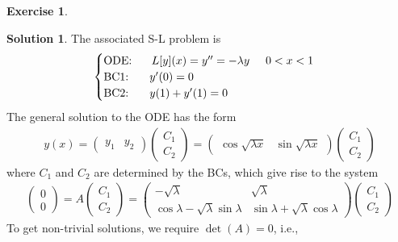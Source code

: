 \documentclass{article}
\theoremstyle{definition}
\newtheorem*{exer*}{Exercise}
\newtheorem*{sln*}{Solution}
\begin{document}
\begin{exer*}
\begin{enumerate}
\begin{sln*}
	 		The associated S-L problem is
	 		\begin{align*}
	 		\begin{cases}
	 		\text{ODE: }\hspace{0.5cm} L[y](x) = y'' = -\lambda y\hspace{0.5cm} 0<x<1\\
	 		\text{BC1: }\hspace{0.5cm} y'(0) = 0\\
	 		\text{BC2: }\hspace{0.5cm} y(1) + y'(1) = 0
	 		\end{cases}
	 		\end{align*}
	 		The general solution to the ODE has the form
	 		\begin{align*}
	 		y(x) = \begin{pmatrix}
	 		y_1 & y_2
	 		\end{pmatrix}
	 		\begin{pmatrix}
	 		C_1\\C_2
	 		\end{pmatrix} = 
	 		\begin{pmatrix}
	 		\cos\sqrt{\lambda x} & \sin\sqrt{\lambda x}
	 		\end{pmatrix}
	 		\begin{pmatrix}
	 		C_1\\C_2
	 		\end{pmatrix}
	 		\end{align*}
	 		where $C_1$ and $C_2$ are determined by the BCs, which give rise to the system
	 		\begin{align*}
	 		\begin{pmatrix}
	 		0\\0
	 		\end{pmatrix} = A\begin{pmatrix}
	 		C_1\\C_2
	 		\end{pmatrix} = \begin{pmatrix}
	 		-\sqrt{\lambda} &  \sqrt{\lambda}  \\  \cos\lambda - \sqrt{\lambda}\sin\lambda  & \sin\lambda + \sqrt{\lambda}\cos\lambda
	 		\end{pmatrix}
	 		\begin{pmatrix}
	 		C_1\\C_2
	 		\end{pmatrix}
	 		\end{align*}
	 		To get non-trivial solutions, we require $\det(A) = 0$, i.e., 
	 		\begin{align*}

\end{align*}
\end{sln*}
\end{enumerate}
\end{exer*}
\end{document}
